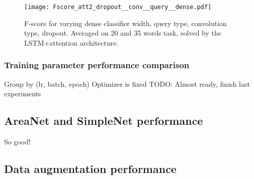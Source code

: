 \begin{figure*}[t!]
    \centering
    \texttt{[image: Fscore\_att2\_dropout\_\_conv\_\_query\_\_dense.pdf]}
    \caption{F-score for varying
        dense classifier width,
        query type,
        convolution type,
        dropout.
        Averaged on 20 and 35 words task, solved by the LSTM+attention architecture.
        }%
    \label{fig:dropout_conv_query_dense}
\end{figure*}

\subsubsection{Training parameter performance comparison}

Group by (lr, batch, epoch)
Optimizer is fixed
TODO: Almost ready, finish last experiments

\subsection{AreaNet and SimpleNet performance}

So good!

\subsection{Data augmentation performance}


